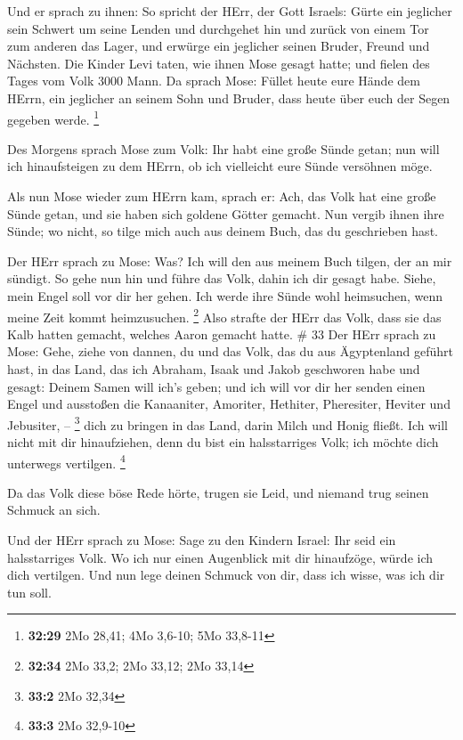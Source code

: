  Und er sprach zu ihnen: So spricht der HErr, der Gott
Israels: Gürte ein jeglicher sein Schwert um seine Lenden und durchgehet
hin und zurück von einem Tor zum anderen das Lager, und erwürge ein
jeglicher seinen Bruder, Freund und Nächsten.  Die Kinder
Levi taten, wie ihnen Mose gesagt hatte; und fielen des Tages vom Volk
3000 Mann.  Da sprach Mose: Füllet heute eure Hände dem
HErrn, ein jeglicher an seinem Sohn und Bruder, dass heute über euch der
Segen gegeben werde. \footnote{\textbf{32:29} 2Mo 28,41; 4Mo 3,6-10; 5Mo
  33,8-11}

 Des Morgens sprach Mose zum Volk: Ihr habt eine große
Sünde getan; nun will ich hinaufsteigen zu dem HErrn, ob ich vielleicht
eure Sünde versöhnen möge.

 Als nun Mose wieder zum HErrn kam, sprach er: Ach, das
Volk hat eine große Sünde getan, und sie haben sich goldene Götter
gemacht.  Nun vergib ihnen ihre Sünde; wo nicht, so tilge
mich auch aus deinem Buch, das du geschrieben hast.

 Der HErr sprach zu Mose: Was? Ich will den aus meinem Buch
tilgen, der an mir sündigt.  So gehe nun hin und führe das
Volk, dahin ich dir gesagt habe. Siehe, mein Engel soll vor dir her
gehen. Ich werde ihre Sünde wohl heimsuchen, wenn meine Zeit kommt
heimzusuchen. \footnote{\textbf{32:34} 2Mo 33,2; 2Mo 33,12; 2Mo 33,14}
 Also strafte der HErr das Volk, dass sie das Kalb hatten
gemacht, welches Aaron gemacht hatte. \# 33  Der HErr sprach
zu Mose: Gehe, ziehe von dannen, du und das Volk, das du aus Ägyptenland
geführt hast, in das Land, das ich Abraham, Isaak und Jakob geschworen
habe und gesagt: Deinem Samen will ich's geben;  und ich
will vor dir her senden einen Engel und ausstoßen die Kanaaniter,
Amoriter, Hethiter, Pheresiter, Heviter und Jebusiter, -- \footnote{\textbf{33:2}
  2Mo 32,34}  dich zu bringen in das Land, darin Milch und
Honig fließt. Ich will nicht mit dir hinaufziehen, denn du bist ein
halsstarriges Volk; ich möchte dich unterwegs vertilgen. \footnote{\textbf{33:3}
  2Mo 32,9-10}

 Da das Volk diese böse Rede hörte, trugen sie Leid, und
niemand trug seinen Schmuck an sich.

 Und der HErr sprach zu Mose: Sage zu den Kindern Israel:
Ihr seid ein halsstarriges Volk. Wo ich nur einen Augenblick mit dir
hinaufzöge, würde ich dich vertilgen. Und nun lege deinen Schmuck von
dir, dass ich wisse, was ich dir tun soll.


